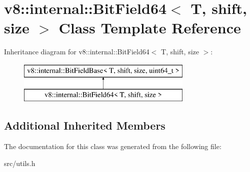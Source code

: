 \hypertarget{classv8_1_1internal_1_1_bit_field64}{}\section{v8\+:\+:internal\+:\+:Bit\+Field64$<$ T, shift, size $>$ Class Template Reference}
\label{classv8_1_1internal_1_1_bit_field64}
Inheritance diagram for v8\+:\+:internal\+:\+:Bit\+Field64$<$ T, shift, size $>$\+:\begin{figure}[H]
\begin{center}
\leavevmode
\includegraphics[height=2.000000cm]{classv8_1_1internal_1_1_bit_field64}
\end{center}
\end{figure}
\subsection*{Additional Inherited Members}


The documentation for this class was generated from the following file\+:\begin{DoxyCompactItemize}
\item 
src/utils.\+h\end{DoxyCompactItemize}
